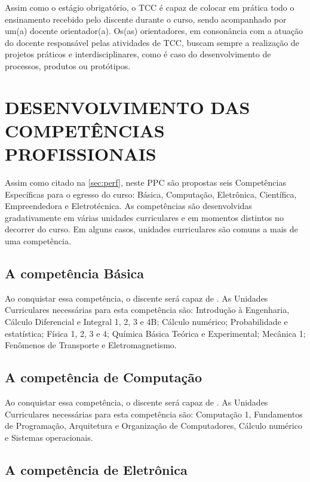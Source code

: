 Assim como o estágio obrigatório, o TCC é capaz de colocar em prática todo o ensinamento recebido pelo discente durante o curso, sendo acompanhado por um(a) docente orientador(a). Os(as) orientadores, em consonância com a atuação do docente responsável pelas atividades de TCC, buscam sempre a realização de projetos práticos e interdisciplinares, como é caso do desenvolvimento de processos, produtos ou protótipos.

\section{DESENVOLVIMENTO DAS COMPETÊNCIAS PROFISSIONAIS}
\label{sec:comp}

Assim como citado na \autoref{sec:perf}, neste PPC são propostas seis Competências Específicas para o egresso do curso: Básica, Computação, Eletrônica, Científica, Empreendedora e Eletrotécnica. As competências são desenvolvidas gradativamente em várias unidades curriculares e em momentos distintos no decorrer do curso. Em alguns casos, unidades curriculares são comuns a mais de uma competência.

\subsection{A competência Básica}

Ao conquistar essa competência, o discente será capaz de \textbf{\compBasica}. As Unidades Curriculares necessárias para esta competência são: Introdução à Engenharia, Cálculo Diferencial e Integral 1, 2, 3 e 4B; Cálculo numérico; Probabilidade e estatística; Física 1, 2, 3 e 4; Química Básica Teórica e Experimental; Mecânica 1; Fenômenos de Transporte e Eletromagnetismo.

\subsection{A competência de Computação}

Ao conquistar essa competência, o discente será capaz de \textbf{\compComp}. As Unidades Curriculares necessárias para esta competência são: Computação 1, Fundamentos de Programação, Arquitetura e Organização de Computadores, Cálculo numérico e Sistemas operacionais.

\subsection{A competência de Eletrônica}

